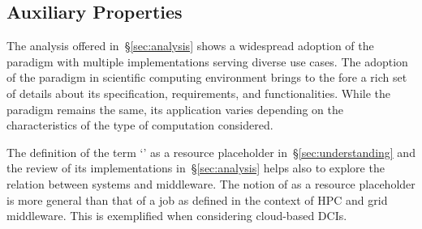 \documentclass{sig-alternate}
\begin{document}







%
\subsection{Auxiliary Properties}
\label{sec:context}



The analysis offered in~\S\ref{sec:analysis} shows a widespread adoption of the
\pilot paradigm with multiple implementations serving diverse use cases.  The
adoption of the \pilot paradigm in scientific computing environment brings to
the fore a rich set of details about its specification, requirements, and
functionalities.  While the paradigm remains the same, its application varies
depending on the characteristics of the type of computation considered.

The definition of the term `\pilot' as a resource placeholder
in~\S\ref{sec:understanding} and the review of its implementations
in~\S\ref{sec:analysis} helps also to explore the relation between \pilot
systems and middleware. The notion of \pilot as a resource placeholder is more
general than that of a job as defined in the context of HPC and grid middleware.
This is exemplified when considering cloud-based DCIs.

\end{document}
